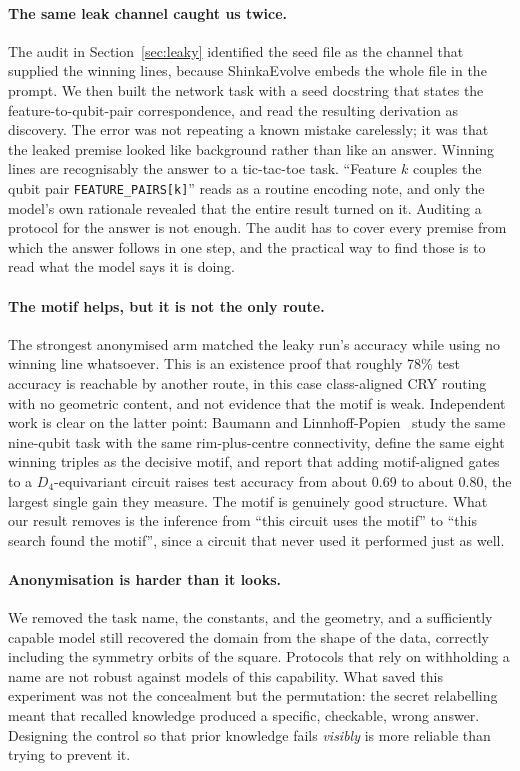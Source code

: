 \documentclass[11pt]{article}
\begin{document}
\paragraph{The same leak channel caught us twice.}
The audit in Section~\ref{sec:leaky} identified the seed file as the channel that
supplied the winning lines, because ShinkaEvolve embeds the whole file in the
prompt. We then built the network task with a seed docstring that states the
feature-to-qubit-pair correspondence, and read the resulting derivation as
discovery. The error was not repeating a known mistake carelessly; it was that
the leaked premise looked like background rather than like an answer. Winning
lines are recognisably the answer to a tic-tac-toe task. ``Feature $k$ couples
the qubit pair \texttt{FEATURE\_PAIRS[k]}'' reads as a routine encoding note, and
only the model's own rationale revealed that the entire result turned on it.
Auditing a protocol for the answer is not enough. The audit has to cover every
premise from which the answer follows in one step, and the practical way to find
those is to read what the model says it is doing.

\paragraph{The motif helps, but it is not the only route.}
The strongest anonymised arm matched the leaky run's accuracy while using no
winning line whatsoever. This is an existence proof that roughly 78\% test
accuracy is reachable by another route, in this case class-aligned CRY routing
with no geometric content, and not evidence that the motif is weak. Independent
work is clear on the latter point: Baumann and Linnhoff-Popien~\cite{baumann2026}
study the same nine-qubit task with the same rim-plus-centre connectivity, define
the same eight winning triples as the decisive motif, and report that adding
motif-aligned gates to a $D_4$-equivariant circuit raises test accuracy from about
0.69 to about 0.80, the largest single gain they measure. The motif is genuinely
good structure. What our result removes is the inference from ``this circuit uses
the motif'' to ``this search found the motif'', since a circuit that never used it
performed just as well.

\paragraph{Anonymisation is harder than it looks.}
We removed the task name, the constants, and the geometry, and a sufficiently
capable model still recovered the domain from the shape of the data, correctly
including the symmetry orbits of the square. Protocols that rely on withholding a
name are not robust against models of this capability. What saved this experiment
was not the concealment but the permutation: the secret relabelling meant that
recalled knowledge produced a specific, checkable, wrong answer. Designing the
control so that prior knowledge fails \emph{visibly} is more reliable than trying
to prevent it.
\end{document}
